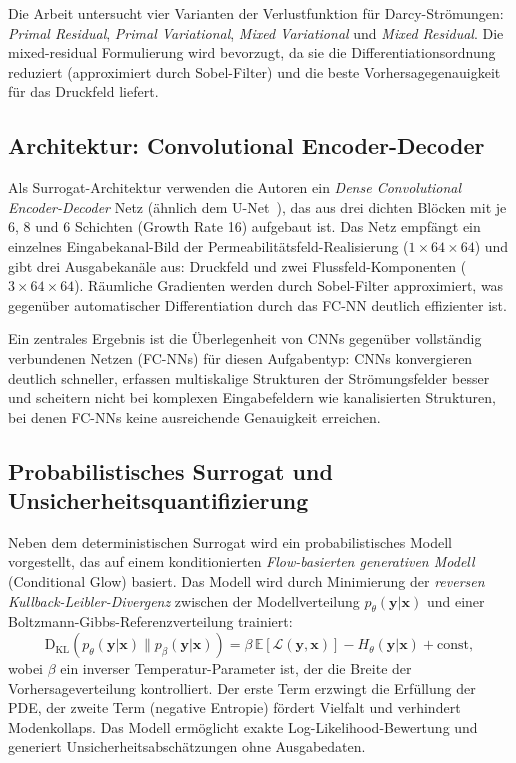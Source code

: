 \documentclass[a4paper,12pt]{article}
\begin{document}
Die Arbeit untersucht vier Varianten der Verlustfunktion für Darcy-Strömungen:
\emph{Primal Residual}, \emph{Primal Variational}, \emph{Mixed Variational} und
\emph{Mixed Residual}. Die mixed-residual Formulierung wird bevorzugt, da sie die
Differentiationsordnung reduziert (approximiert durch Sobel-Filter) und die beste
Vorhersagegenauigkeit für das Druckfeld liefert.

\subsection*{Architektur: Convolutional Encoder-Decoder}

Als Surrogat-Architektur verwenden die Autoren ein \emph{Dense Convolutional Encoder-Decoder}
Netz (ähnlich dem U-Net~\cite{ronneberger2015unet}), das aus drei dichten Blöcken mit je 6,
8 und 6 Schichten (Growth Rate 16) aufgebaut ist. Das Netz empfängt ein einzelnes
Eingabekanal-Bild der Permeabilitätsfeld-Realisierung ($1 \times 64 \times 64$) und gibt
drei Ausgabekanäle aus: Druckfeld und zwei Flussfeld-Komponenten ($3 \times 64 \times 64$).
Räumliche Gradienten werden durch Sobel-Filter approxi\-miert, was gegenüber automatischer
Differentiation durch das FC-NN deutlich effizienter ist.

Ein zentrales Ergebnis ist die Überlegenheit von CNNs gegenüber vollständig verbundenen
Netzen (FC-NNs) für diesen Aufgabentyp: CNNs konvergieren deutlich schneller, erfassen
multi\-skalige Strukturen der Strömungsfelder besser und scheitern nicht bei komplexen
Eingabefeldern wie kanalisierten Strukturen, bei denen FC-NNs keine ausreichende Genauigkeit
erreichen.

\subsection*{Probabilistisches Surrogat und Unsicherheitsquantifizierung}

Neben dem deterministischen Surrogat wird ein probabilistisches Modell vorgestellt,
das auf einem konditionierten \emph{Flow-basierten generativen Modell} (Conditional Glow)
basiert. Das Modell wird durch Minimierung der \emph{reversen Kullback-Leibler-Divergenz}
zwischen der Modellverteilung $p_\theta(\mathbf{y}|\mathbf{x})$ und einer
Boltzmann-Gibbs-Referenzverteilung trainiert:
%
\begin{equation}
\text{D}_{\mathrm{KL}}(p_\theta(\mathbf{y}|\mathbf{x}) \| p_\beta(\mathbf{y}|\mathbf{x})) = \beta\, \mathbb{E}[\mathcal{L}(\mathbf{y},\mathbf{x})] - H_\theta(\mathbf{y}|\mathbf{x}) + \text{const},
\end{equation}
%
wobei $\beta$ ein inverser Temperatur-Parameter ist, der die Breite der Vorhersageverteilung
kontrolliert. Der erste Term erzwingt die Erfüllung der PDE, der zweite Term (negative
Entropie) fördert Vielfalt und verhindert Modenkollaps. Das Modell ermöglicht exakte
Log-Likelihood-Bewertung und generiert Unsicherheitsabschätzungen ohne Ausgabedaten.
\end{document}

